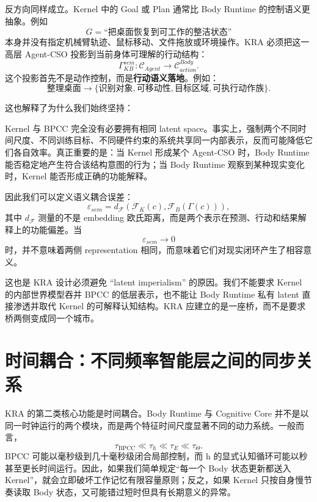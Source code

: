 反方向同样成立。Kernel 中的 Goal 或 Plan 通常比 Body Runtime 的控制语义更抽象。例如
\[
G=
\text{``把桌面恢复到可工作的整洁状态''}
\]
本身并没有指定机械臂轨迹、鼠标移动、文件拖放或环境操作。KRA 必须把这一高层 Agent-CSO 投影到当前身体可理解的行动结构：
\[
\Gamma_{KB}^{sem}:
\mathcal C_{Agent}
\rightarrow
\mathcal C^{Body}_{action}.
\]
这个投影首先不是动作控制，而是\textbf{行动语义落地}。例如：
\[
\text{整理桌面}
\rightarrow
\{
\text{识别对象},
\text{可移动性},
\text{目标区域},
\text{可执行动作族}
\}.
\]

这也解释了为什么我们始终坚持：
\begin{statementbox}
\centering
{}
\end{statementbox}
Kernel 与 BPCC 完全没有必要拥有相同 latent space。事实上，强制两个不同时间尺度、不同训练目标、不同硬件约束的系统共享同一内部表示，反而可能降低它们各自效率。真正重要的是：当 Kernel 形成某个 Agent-CSO 时，Body Runtime 能否稳定地产生符合该结构意图的行为；当 Body Runtime 观察到某种现实变化时，Kernel 能否形成正确的功能解释。

因此我们可以定义语义耦合误差：
\[
\varepsilon_{sem}
=
d_{\mathcal F}
\left(
\mathcal F_K(c),
\mathcal F_B(\Gamma(c))
\right),
\]
其中 $d_{\mathcal F}$ 测量的不是 embedding 欧氏距离，而是两个表示在预测、行动和结果解释上的功能偏差。当
\[
\varepsilon_{sem}\rightarrow 0
\]
时，并不意味着两侧 representation 相同，而意味着它们对现实闭环产生了相容意义。

这也是 KRA 设计必须避免 ``latent imperialism'' 的原因。我们不能要求 Kernel 的内部世界模型吞并 BPCC 的低层表示，也不能让 Body Runtime 私有 latent 直接渗透并取代 Kernel 的可解释认知结构。KRA 应建立的是一座桥，而不是要求桥两侧变成同一个城市。

\section{时间耦合：不同频率智能层之间的同步关系}
\label{sec:kra-temporal-coupling}

KRA 的第二类核心功能是时间耦合。Body Runtime 与 Cognitive Core 并不是以同一时钟运行的两个模块，而是两个特征时间尺度显著不同的动力系统。一般而言，
\[
\tau_{\mathrm{BPCC}}
\ll
\tau_h
\ll
\tau_E
\ll
\tau_\Theta.
\]
BPCC 可能以毫秒级到几十毫秒级闭合局部控制，而 h 的显式认知循环可能以秒甚至更长时间运行。因此，如果我们简单规定``每一个 Body 状态更新都送入 Kernel''，就会立即破坏工作记忆有限容量原则；反之，如果 Kernel 只按自身慢节奏读取 Body 状态，又可能错过短时但具有长期意义的异常。

